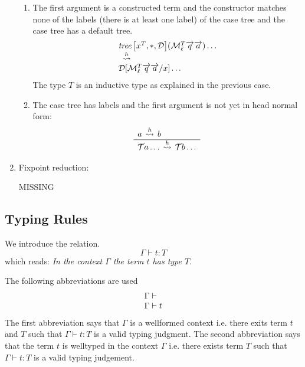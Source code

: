 \begin{enumerate}
\begin{enumerate}
            \item The first argument is a constructed term and the constructor
                matches none of the labels (there is at least one label) of the
                case tree and the case tree has a default tree.
                $$
                \vertlist{
                    \ctreebr{x^T, *, \ct D}
                        (\Make^T_\ell \vec q \vec a)
                        \ldots
                    \\ \hreduce \\
                    \ct D[\Make^T_\ell \vec q \vec a / x]
                        \ldots
                }
                $$
                The type $T$ is an inductive type as explained in the previous
                case.

            \item The case tree has labels and the first argument is not yet in
                head normal form:
                $$
                \begin{array}{l} 
                    a \,\stackrel{h}{\leadsto}\, b
                 \\ \hline 
                    {\mathcal T} a \ldots \,\stackrel{h}{\leadsto}\, {\mathcal T} b \ldots
                 \end{array}
                $$
        \end{enumerate}



    \item Fixpoint reduction:

        MISSING
\end{enumerate}








\subsection{Typing Rules}

We introduce the relation.
$$
\Gamma \vdash t: T
$$
which reads: \emph{In the context $\Gamma$ the term $t$ has type $T$}.

The following abbreviations are used
$$
\begin{array}{lllll} 
    \Gamma \vdash
    \\
    \Gamma \vdash t
 \end{array}
$$
The first abbreviation says that $\Gamma$ is a wellformed context i.e. there
exits term $t$ and $T$ such that $\Gamma \vdash t : T$ is a valid typing
judgment.
%
The second abbreviation says that the term $t$ is welltyped in the context
$\Gamma$ i.e. there exists term $T$ such that $\Gamma \vdash t: T$ is a valid
typing judgement.


